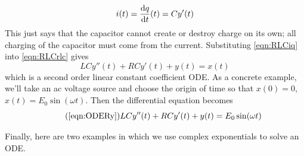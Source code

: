 \begin{eg}
\begin{equation}\label{eqn:RLCiq}
i(t)=\diff{q}{t}(t) = Cy'(t)
\end{equation}
This just says that the capacitor cannot create or destroy charge on 
its own; all charging of the capacitor must come from the current.  
Substituting \eqref{eqn:RLCiq} into \eqref{eqn:RLCrlc} gives
\begin{equation*}%
 LCy''(t) + RCy'(t) + y(t) = x(t)
\end{equation*}
which is a second order linear constant coefficient ODE. 
As a concrete example, we'll take  an ac voltage source and choose the 
origin of time so that $x(0)=0$, $x(t)=E_0\sin(\omega t)$. Then the differential equation becomes
\label{eqn:ODERy}
\begin{equation}\tag{\ref{eqn:ODERy}}
LCy''(t)+RCy'(t)+y(t)=E_0\sin(\omega t)
\end{equation}
\end{eg} 

Finally, here are two examples in which we use complex exponentials to solve an ODE.

